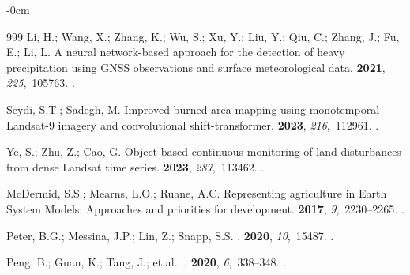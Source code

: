 \documentclass[asi,article,accept,pdftex,moreauthors]{Definitions/mdpi}
\begin{document}
\begin{adjustwidth}{-\extralength}{0cm}
\begin{thebibliography}{999}
Li, H.; Wang, X.; Zhang, K.; Wu, S.; Xu, Y.; Liu, Y.; Qiu, C.; Zhang, J.; Fu,
  E.; Li, L.
\newblock A neural network-based approach for the detection of heavy
  precipitation using GNSS observations and surface meteorological data.
 {\bf
  2021}, {\em 225},~105763.
.

Seydi, S.T.; Sadegh, M.
\newblock Improved burned area mapping using monotemporal Landsat-9 imagery and
  convolutional shift-transformer.
 {\bf 2023}, {\em 216},~112961.
.

Ye, S.; Zhu, Z.; Cao, G.
\newblock Object-based continuous monitoring of land disturbances from dense
  Landsat time series.
 {\bf 2023}, {\em 287},~113462.
.

McDermid, S.S.; Mearns, L.O.; Ruane, A.C.
\newblock Representing agriculture in Earth System Models: Approaches and
  priorities for development.
 {\bf 2017}, {\em
  9},~2230--2265.
.

Peter, B.G.; Messina, J.P.; Lin, Z.; Snapp, S.S.
.
 {\bf 2020}, {\em 10},~15487.
.

Peng, B.; Guan, K.; Tang, J.; {et al.}.
.
 {\bf 2020}, {\em 6},~338--348.
.

\end{thebibliography}

%

\PublishersNote{}
\end{adjustwidth}
\end{document}
